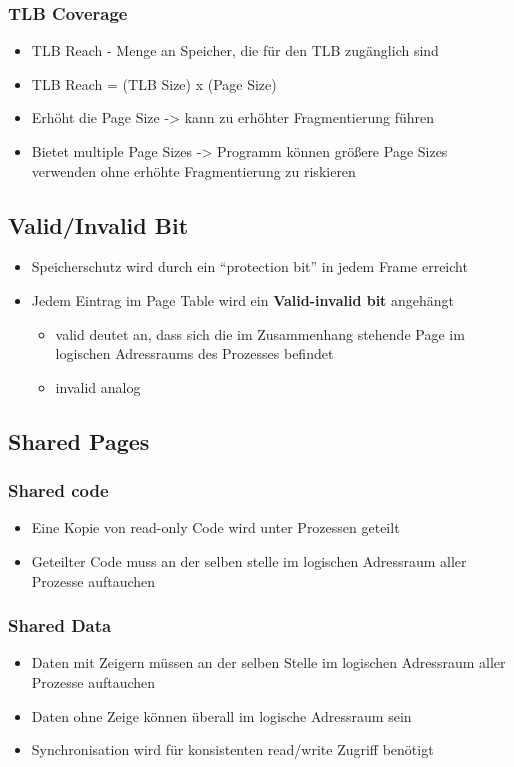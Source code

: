 \documentclass[a4paper]{scrreprt}
\begin{document}
\subsubsection{TLB Coverage}
\begin{itemize}
\item TLB Reach - Menge an Speicher, die für den TLB zugänglich sind
\item TLB Reach = (TLB Size) x (Page Size)

\item Erhöht die Page Size -> kann zu erhöhter Fragmentierung führen
\item Bietet multiple Page Sizes -> Programm können größere Page Sizes verwenden ohne erhöhte Fragmentierung zu riskieren
\end{itemize}

\subsection{Valid/Invalid Bit}
\begin{itemize}
\item Speicherschutz wird durch ein "`protection bit"' in jedem Frame erreicht
\item Jedem Eintrag im Page Table wird ein \textbf{Valid-invalid bit} angehängt
\begin{itemize}
\item valid deutet an, dass sich die im Zusammenhang stehende Page im logischen Adressraums des Prozesses befindet
\item invalid analog

\end{itemize}
\end{itemize}

\subsection{Shared Pages}
\subsubsection{Shared code}
\begin{itemize}
\item Eine Kopie von read-only Code wird unter Prozessen geteilt
\item Geteilter Code muss an der selben stelle im logischen Adressraum aller Prozesse auftauchen
\end{itemize}
\subsubsection{Shared Data}
\begin{itemize}
\item Daten mit Zeigern müssen an der selben Stelle im logischen Adressraum aller Prozesse auftauchen
\item Daten ohne  Zeige können überall im logische Adressraum sein
\item Synchronisation wird für konsistenten read/write Zugriff benötigt
\end{itemize}
\end{document}
